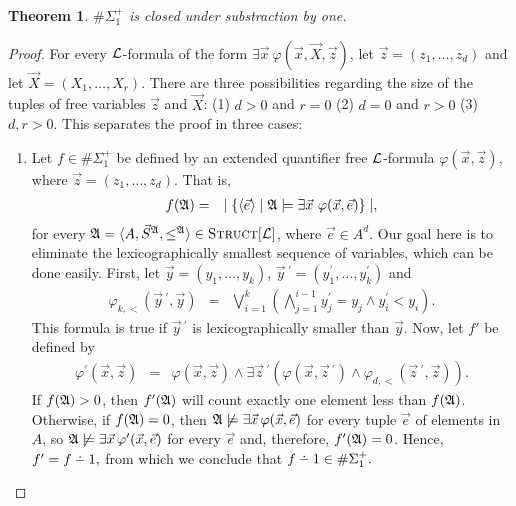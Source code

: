 \documentclass[12pt]{article}
\def\dotminus{\mathbin{\ooalign{\hss\raise1ex\hbox{.}\hss\cr
  \mathsurround=0pt$-$}}}
\def\E1{\#\Sigma_1^{+}}
\def\Truc{\textsc{Struct}[\L]}
\def\A{{\frak A}}
\def\L{{\cal L}}
\def\S{\vec{S}}
\def\X{\vec{X}}
\def\e{\vec{e}} %
\def\x{\vec{x}} %
\def\y{\vec{y}} %
\def\z{\vec{z}} %
\newtheorem{theo}{Theorem}
\begin{document}
\begin{theo}
$\E1$ is closed under substraction by one.
\end{theo}
\begin{proof}
For every $\L$-formula of the form $\exists\x\:\varphi(\x,\X,\z)$, let $\z = (z_1,\dots,z_d)$ and let $\X = (X_1,\dots,X_r)$. There are three possibilities regarding the size of the tuples of free variables $\z$ and $\X$: (1) $d>0$ and $r=0$ (2) $d=0$ and $r>0$ (3) $d,r>0$. This separates the proof in three cases:
\begin{enumerate}


\item Let $f \in \E1$ be defined by an extended quantifier free $\L$-formula $\varphi(\x,\z)$, where $\z = (z_1,\dots,z_d)$. That is,
\begin{eqnarray*}
f(\A) &=& \mid \{ \langle\e\rangle \mid \A \models \exists \x \ \varphi(\x,\e) \} \mid,
\end{eqnarray*}
for every $\A = \langle A, \S^{\A}, \leq^{\A} \rangle \in \Truc$, where $\e \in A^d$. Our goal here is to eliminate the lexicographically smallest sequence of variables, which can be done easily. First, let $\y = (y_1,\dots,y_k)$, $\y\,^\prime = (y_1^\prime,\dots,y_k^\prime)$ and
\begin{eqnarray*}
\varphi_{k,<}(\y\,^\prime,\y) &=& \bigvee_{i = 1}^k \left( \bigwedge_{j=1}^{i-1} y_j^\prime = y_j \wedge y_i^\prime < y_i \right).
\end{eqnarray*}
This formula is true if $\y\,^\prime$ is lexicographically smaller than $\y$. Now, let $f'$ be defined by
\begin{eqnarray*}
\varphi^\prime(\x,\z) &=& \varphi(\x,\z) \wedge \exists \z\,^\prime (\varphi(\x,\z\,^\prime) \wedge \varphi_{d,<}(\z\,^\prime,\z ) ).
\end{eqnarray*}
If $f(\A)>0$, then $f'(\A)$ will count exactly one element less than $f(\A)$. Otherwise, if $f(\A)=0$, then $\A \not\models\exists \x\,\varphi(\x,\e)$ for every tuple $\e$ of elements in $A$, so $\A \not\models\exists \x\,\varphi^\prime(\x,\e)$ for every $\e$ and, therefore, $f'(\A)=0$. Hence, $f' = f\dotminus 1,$ from which we conclude that $f\dotminus 1\in\E1.$



\end{enumerate}
\end{proof}
\end{document}
